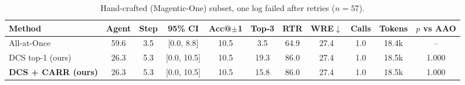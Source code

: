 \begin{table}[t]
\centering
\caption{Hand-crafted (Magentic-One) subset, one log failed after retries ($n=57$).}
\label{tab:main_hand}
\footnotesize
\setlength{\tabcolsep}{4pt}
\begin{tabular}{@{}lcccccccccc@{}}
\toprule
Method & Agent & Step & 95\% CI & Acc@$\pm$1 & Top-3 & RTR & WRE$\downarrow$ & Calls & Tokens & $p$ vs AAO \\
\midrule
All-at-Once~\cite{zhang2025whowhen} & 59.6 & 3.5 & [0.0, 8.8] & 10.5 & 3.5 & 64.9 & 27.4 & 1.0 & 18.4k & -- \\
DCS top-1 (ours) & 26.3 & 5.3 & [0.0, 10.5] & 10.5 & 19.3 & 86.0 & 27.4 & 1.0 & 18.5k & 1.000 \\
\textbf{DCS + CARR (ours)} & 26.3 & 5.3 & [0.0, 10.5] & 10.5 & 15.8 & 86.0 & 27.4 & 1.0 & 18.5k & 1.000 \\
\bottomrule
\end{tabular}
\end{table}